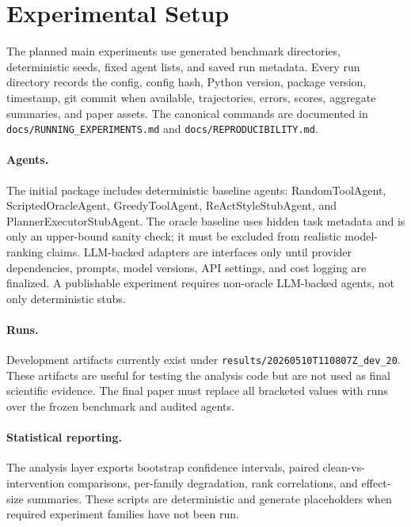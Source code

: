 \section{Experimental Setup}

The planned main experiments use generated benchmark directories, deterministic seeds, fixed agent lists, and saved run metadata. Every run directory records the config, config hash, Python version, package version, timestamp, git commit when available, trajectories, errors, scores, aggregate summaries, and paper assets. The canonical commands are documented in \texttt{docs/RUNNING\_EXPERIMENTS.md} and \texttt{docs/REPRODUCIBILITY.md}.

\paragraph{Agents.}
The initial package includes deterministic baseline agents: RandomToolAgent, ScriptedOracleAgent, GreedyToolAgent, ReActStyleStubAgent, and PlannerExecutorStubAgent. The oracle baseline uses hidden task metadata and is only an upper-bound sanity check; it must be excluded from realistic model-ranking claims. LLM-backed adapters are interfaces only until provider dependencies, prompts, model versions, API settings, and cost logging are finalized. A publishable experiment requires non-oracle LLM-backed agents, not only deterministic stubs.

\paragraph{Runs.}
Development artifacts currently exist under \texttt{results/20260510T110807Z\_dev\_20}. These artifacts are useful for testing the analysis code but are not used as final scientific evidence. The final paper must replace all bracketed values with runs over the frozen benchmark and audited agents.

\paragraph{Statistical reporting.}
The analysis layer exports bootstrap confidence intervals, paired clean-vs-intervention comparisons, per-family degradation, rank correlations, and effect-size summaries. These scripts are deterministic and generate placeholders when required experiment families have not been run.
